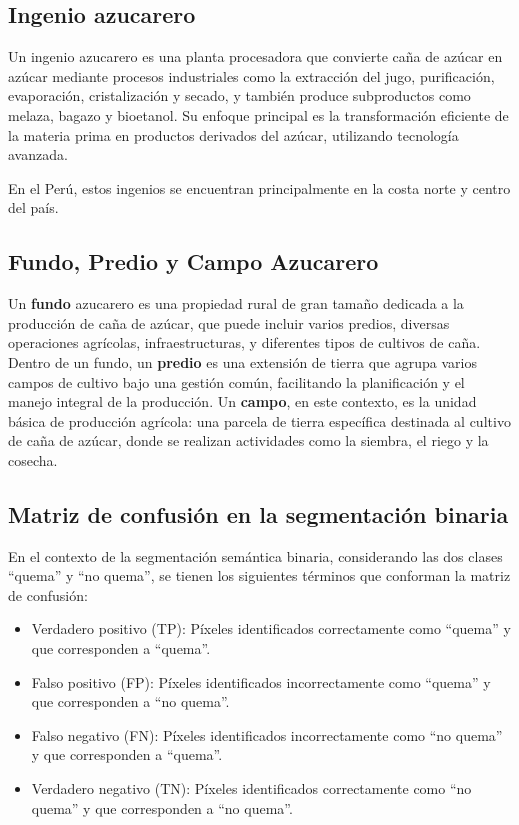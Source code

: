 \subsection{Ingenio azucarero}
Un ingenio azucarero es una planta procesadora que convierte caña de azúcar en azúcar mediante procesos industriales como la extracción del jugo, purificación, evaporación, cristalización y secado, y también produce subproductos 
como melaza, bagazo y bioetanol. Su enfoque principal es la transformación eficiente de la materia prima en productos derivados del azúcar, utilizando tecnología avanzada. 

En el Perú, estos ingenios se encuentran principalmente en la costa norte y centro del país.

\subsection{Fundo, Predio y Campo Azucarero}
Un \textbf{fundo} azucarero es una propiedad rural de gran tamaño dedicada a la producción de caña de azúcar, que puede incluir varios predios, diversas operaciones agrícolas, infraestructuras, y diferentes tipos de cultivos 
de caña. Dentro de un fundo, un \textbf{predio} es una extensión de tierra que agrupa varios campos de cultivo bajo una gestión común, facilitando la planificación y el manejo integral de la producción. Un 
\textbf{campo}, en este contexto, es la unidad básica de producción agrícola: una parcela de tierra específica destinada al cultivo de caña de azúcar, donde se realizan actividades como la siembra, el riego y la cosecha.

\subsection{Matriz de confusión en la segmentación binaria}
En el contexto de la segmentación semántica binaria, considerando las dos clases ``quema'' y ``no quema'', se tienen
los siguientes términos que conforman la matriz de confusión:

\begin{itemize}
    \item Verdadero positivo (TP): Píxeles identificados correctamente como ``quema'' y que corresponden a ``quema''.
    \item Falso positivo (FP): Píxeles identificados incorrectamente como ``quema'' y que corresponden a ``no quema''.
    \item Falso negativo (FN): Píxeles identificados incorrectamente como ``no quema'' y que corresponden a ``quema''.
    \item Verdadero negativo (TN): Píxeles identificados correctamente como ``no quema'' y que corresponden a ``no quema''.
\end{itemize}

